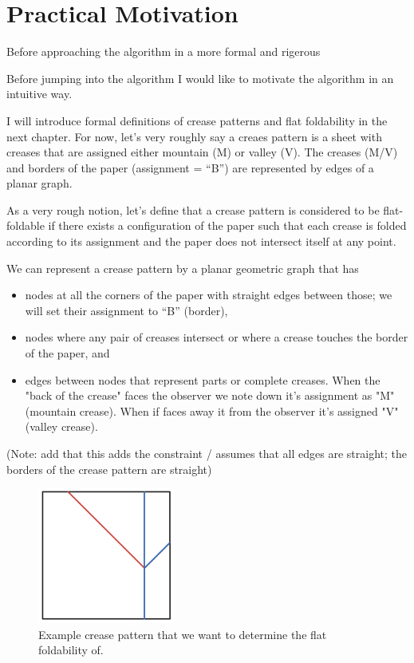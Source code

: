 \chapter{Practical Motivation}

Before approaching the algorithm in a more formal and rigerous 

Before jumping into the algorithm I would like to motivate the algorithm in an intuitive way.

I will introduce formal definitions of crease patterns and flat foldability in the next chapter.
For now, let's very roughly say a creaes pattern is a sheet with creases that are assigned either mountain (M) or valley (V).
The creases (M/V) and borders of the paper (assignment = ``B'') are represented by edges of a planar graph.

As a very rough notion, let's define that a crease pattern is considered to be flat-foldable if there exists a configuration
of the paper such that each crease is folded according to its assignment and the paper does not intersect itself at any point.

We can represent a crease pattern by a planar geometric graph that has
\begin{itemize}
    \item nodes at all the corners of the paper with straight edges between those; we will set their assignment to ``B'' (border),
    \item nodes where any pair of creases intersect or where a crease touches the border of the paper, and
    \item edges between nodes that represent parts or complete creases. When the "back of the crease" faces the observer we note down it's assignment as "M" (mountain crease). When if faces away it from the observer it's assigned "V" (valley crease).
\end{itemize}

(Note: add that this adds the constraint / assumes that all edges are straight; the borders of the crease pattern are straight)

\begin{figure}[h]
\centering
\includegraphics[width=0.4\textwidth]{assets/demo_creasepattern.png}
\caption{Example crease pattern that we want to determine the flat foldability of.}
\label{fig:demo_creasepattern}
\end{figure}

